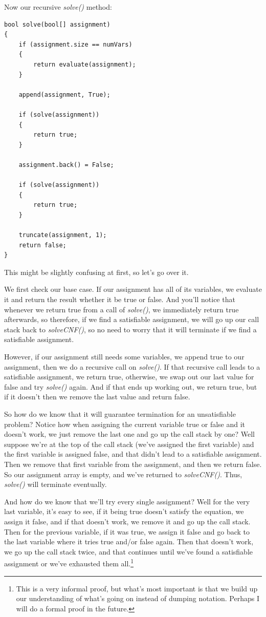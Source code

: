 \documentclass[oneside]{book}
\begin{document}
Now our recursive \textit{solve()} method:

\begin{lstlisting}
bool solve(bool[] assignment)
{
    if (assignment.size == numVars)
    {
        return evaluate(assignment);
    }

    append(assignment, True);

    if (solve(assignment))
    {
        return true;
    }

    assignment.back() = False;

    if (solve(assignment))
    {
        return true;
    }

    truncate(assignment, 1);
    return false;
}
\end{lstlisting}

This might be slightly confusing at first, so let's go over it.

We first check our base case. If our assignment has all of its variables, we
evaluate it and return the result whether it be true or false. And you'll notice
that whenever we return true from a call of \textit{solve()}, we immediately
return true afterwards, so therefore, if we find a satisfiable assignment, we
will go up our call stack back to \textit{solveCNF()}, so no need to worry that
it will terminate if we find a satisfiable assignment.

However, if our assignment still needs some variables, we append true to our
assignment, then we do a recursive call on \textit{solve()}. If that recursive
call leads to a satisfiable assignment, we return true, otherwise, we swap out
our last value for false and try \textit{solve()} again. And if that ends up
working out, we return true, but if it doesn't then we remove the last value
and return false.

So how do we know that it will guarantee termination for an unsatisfiable problem?
Notice how when assigning the current variable true or false and it doesn't
work, we just remove the last one and go up the call stack by one? Well
suppose we're at the top of the call stack (we've assigned the first variable)
and the first variable is assigned false, and that didn't lead to a satisfiable
assignment. Then we remove that first variable from the assignment, and then
we return false. So our assignment array is empty, and we've returned to
\textit{solveCNF()}. Thus, \textit{solve()} will terminate eventually.

And how do we know that we'll try every single assignment?
Well for the very last variable, it's easy to see, if it being true doesn't satisfy
the equation, we assign it false, and if that doesn't work, we remove it and go
up the call stack. Then for the previous variable, if it was true, we assign it
false and go back to the last variable where it tries true and/or false again.
Then that doesn't work, we go up the call stack twice, and that continues until
we've found a satisfiable assignment or we've exhausted them all.\footnote{
This is a very informal proof, but what's most important is that we build up
our understanding of what's going on instead of dumping notation. Perhaps I
will do a formal proof in the future.}
\end{document}
